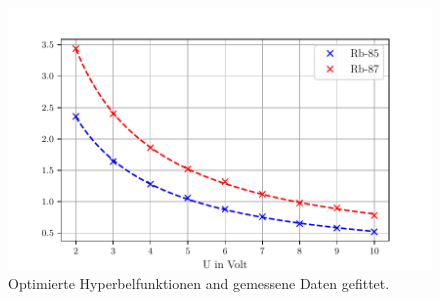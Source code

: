 \FloatBarrier
\begin{figure}
  \centering
  \includegraphics{perioden.pdf}
  \caption{Optimierte Hyperbelfunktionen and gemessene Daten gefittet.}
  \label{fig:perioden}
\end{figure}
\FloatBarrier